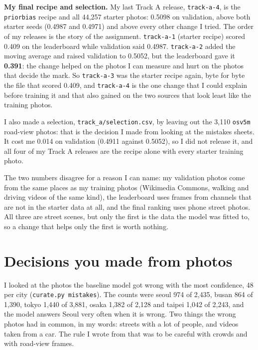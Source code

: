 \documentclass[11pt]{article}
\begin{document}
\textbf{My final recipe and selection.} My last Track A release,
\texttt{track-a-4}, is the \texttt{priorbias} recipe and all 44,257 starter
photos: 0.5098 on validation, above both starter seeds (0.4987 and 0.4971) and
above every other change I tried. The order of my releases is the story of the
assignment.
\texttt{track-a-1} (starter recipe) scored 0.409 on the leaderboard while
validation said 0.4987. \texttt{track-a-2} added the moving average and raised
validation to 0.5052, but the leaderboard gave it \textbf{0.391}: the change
helped on the photos I can measure and hurt on the photos that decide the mark.
So \texttt{track-a-3} was the starter recipe again, byte for byte the file that
scored 0.409, and \texttt{track-a-4} is the one change that I could explain
before training it and that also gained on the two sources that look least like
the training photos.

I also made a selection, \texttt{track\_a/selection.csv}, by leaving out the
3,110 \texttt{osv5m} road-view photos: that is the decision I made from looking
at the mistakes sheets. It cost me 0.014 on validation (0.4911 against 0.5052),
so I did not release it, and all four of my Track A releases are the recipe
alone with every starter training photo.

The two numbers disagree for a reason I can name: my validation photos come from
the same places as my training photos (Wikimedia Commons, walking and driving
videos of the same kind), the leaderboard uses frames from channels that are
not in the starter data at all, and the final ranking uses phone street
photos. All three are street scenes, but only the first is the data the model
was fitted to, so a change that helps only the first is worth nothing.

\section*{Decisions you made from photos}



I looked at the photos the baseline model got wrong with the most confidence,
48 per city (\texttt{curate.py mistakes}). The counts were seoul 974 of 2,435,
busan 864 of 1,390, tokyo 1,440 of 3,881, osaka 1,382 of 2,128 and taipei 1,042
of 2,243, and the model answers Seoul very often when it is wrong. Two things
the wrong photos had in common, in my words: streets with a lot of people, and
videos taken from a car. The rule I wrote from that was to be careful with
crowds and with road-view frames.
\end{document}
